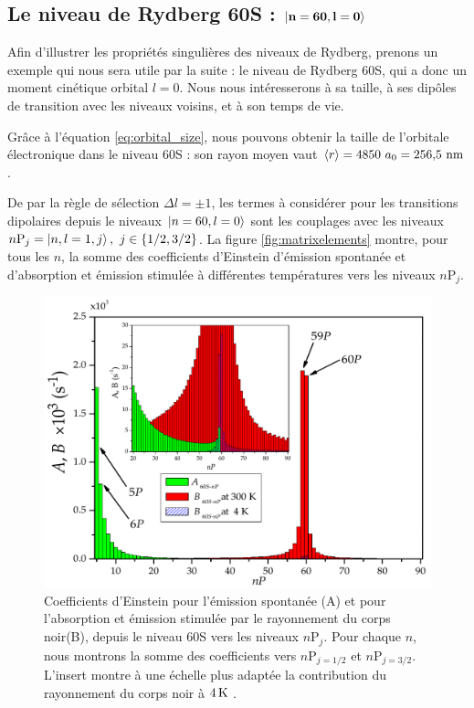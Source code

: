 	\subsection{Le niveau de Rydberg 60S : $\mathbf{\ket{n=60,l=0}}$}
\noindent Afin d'illustrer les propriétés singulières des niveaux de Rydberg, prenons un exemple qui nous sera utile par la suite : le niveau de Rydberg 60S, qui a donc un moment cinétique orbital $l=0$. Nous nous intéresserons à sa taille, à ses dipôles de transition avec les niveaux voisins, et à son temps de vie.

Grâce à l'équation \eqref{eq:orbital_size}, nous pouvons obtenir la taille de l'orbitale électronique dans le niveau 60S : son rayon moyen vaut $\braket{r} = 4850~a_0 = \numv{256.5}\si{\nano\meter}$.

De par la règle de sélection $\Delta l=\pm1$, les termes à considérer pour les transitions dipolaires depuis le niveaux $\ket{n=60,l=0}$ sont les couplages avec les niveaux $n\mathrm{P}_j = \ket{n,l=1,j},~j\in\{1/2,3/2\}$.
La figure \eqref{fig:matrixelements} montre, pour tous les $n$, la somme des coefficients d'Einstein d'émission spontanée et d'absorption et émission stimulée à différentes températures vers les niveaux $n\mathrm{P}_j$.

\begin{figure}[th!]
	\centering
	\includegraphics[width=0.7\linewidth]{figures/lifetime}
	\caption[Coefficients d'Einstein de 60S vers $n\mathrm{P}_j,j\in{1/2,3/2}$]{
	Coefficients d'Einstein pour l'émission spontanée (A) et pour l'absorption et émission stimulée par le rayonnement du corps noir(B), depuis le niveau 60S vers les niveaux $n\mathrm{P}_j$.
	Pour chaque $n$, nous montrons la somme des coefficients vers $n\mathrm{P}_{j=1/2}$ et $n\mathrm{P}_{j=3/2}$.
	L'insert montre à une échelle plus adaptée la contribution du rayonnement du corps noir à $\SIv{4}{\kelvin}$.
	}
	\label{fig:matrixelements}
\end{figure}

